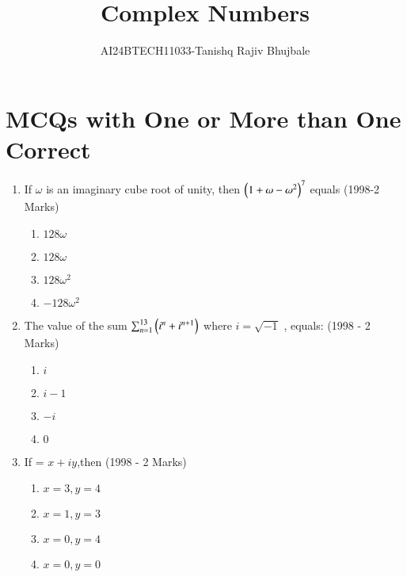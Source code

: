 \documentclass[journal]{IEEEtran}
\begin{document}

\vspace{3cm}
\title{Complex Numbers}
\author{AI24BTECH11033-Tanishq Rajiv Bhujbale}
\maketitle
\bigskip

\renewcommand{\thefigure}{\theenumi}
\renewcommand{\thetable}{\theenumi}

\section{MCQs with One or More than One Correct}
\begin{enumerate}
    \item If $\omega$ is an imaginary cube root of unity, then 
    $\left(1+\omega-\omega^2\right)^7$ equals \hfill (1998-2 Marks)
    \begin{multicols}{4}
    \begin{enumerate}
    \item $128\omega$    
    \item $128\omega$
    \item $128\omega^2$
    \item $-128\omega^2$
    \end{enumerate}
    \end{multicols}
    \item The value of the sum 
   $\sum_{n=1}^{13} \left(i^n+i^{n+1}\right)$
where  $i=\sqrt{-1}$ , equals: \hfill (1998 - 2 Marks)
\begin{multicols}{4}
    \begin{enumerate}
    \item $i$
    \item $i - 1$
    \item $-i$
    \item $0$
    \end{enumerate}
\end{multicols}
    \item If = $x+iy$,then \hfill (1998 - 2 Marks)
\begin{multicols}{4}
\begin{enumerate}
    \item $x=3,y=4$    
    \item $x=1,y=3$ 
    \item $x=0,y=4$
    \item $x=0,y=0$

\end{enumerate}
\end{multicols}
\end{enumerate}
\end{document}
